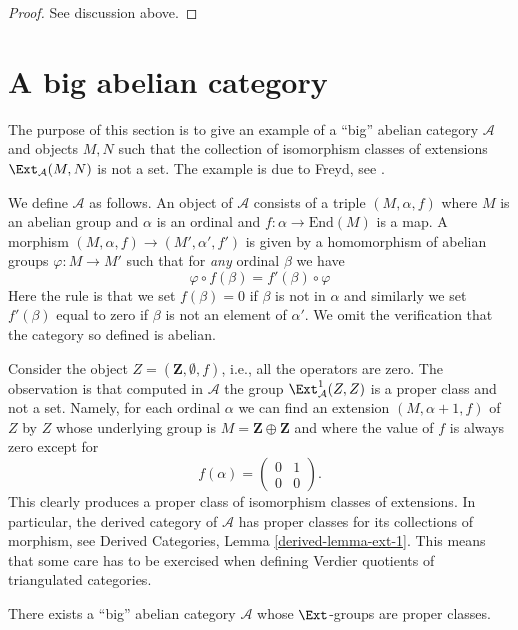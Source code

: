 \begin{proof}
See discussion above.
\end{proof}



\section{A big abelian category}
\label{section-big}

\noindent
The purpose of this section is to give an example of a ``big'' abelian category
$\mathcal{A}$ and objects $M, N$ such that the collection of isomorphism
classes of extensions $\Ext_\mathcal{A}(M, N)$ is not a set.
The example is due to Freyd, see \cite[page 131, Exercise A]{Freyd}.

\medskip\noindent
We define $\mathcal{A}$ as follows. An object of $\mathcal{A}$
consists of a triple $(M, \alpha, f)$ where $M$ is an abelian group and
$\alpha$ is an ordinal and $f : \alpha \to \text{End}(M)$ is a map.
A morphism $(M, \alpha, f) \to (M', \alpha', f')$ is given by a homomorphism
of abelian groups $\varphi : M \to M'$ such that for {\it any} ordinal $\beta$
we have
$$
\varphi \circ f(\beta) = f'(\beta) \circ \varphi
$$
Here the rule is that we set $f(\beta) = 0$ if $\beta$ is not in
$\alpha$ and similarly we set $f'(\beta)$ equal to zero if $\beta$ is not an
element of $\alpha'$. We omit the verification that the category so defined
is abelian.

\medskip\noindent
Consider the object $Z = (\mathbf{Z}, \emptyset, f)$, i.e., all the
operators are zero. The observation is that computed in
$\mathcal{A}$ the group $\Ext^1_\mathcal{A}(Z, Z)$ is a proper class
and not a set. Namely, for each ordinal $\alpha$ we can find an extension
$(M, \alpha + 1, f)$ of $Z$ by $Z$ whose underlying group is
$M = \mathbf{Z} \oplus \mathbf{Z}$ and where the value of $f$ is
always zero except for
$$
f(\alpha) =
\left(
\begin{matrix}
0 & 1 \\
0 & 0
\end{matrix}
\right).
$$
This clearly produces a proper class of isomorphism classes of extensions.
In particular, the derived category of $\mathcal{A}$ has proper classes for
its collections of morphism, see
Derived Categories, Lemma \ref{derived-lemma-ext-1}. This means that some
care has to be exercised when defining Verdier quotients of triangulated
categories.

\begin{lemma}
\label{lemma-big-abelian-category}
There exists a ``big'' abelian category $\mathcal{A}$ whose
$\Ext$-groups are proper classes.
\end{lemma}

